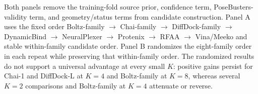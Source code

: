 \begin{table}[!ht]
\vspace{2pt}
\raggedright\footnotesize
Both panels remove the training-fold source prior, confidence term, PoseBusters-validity term, and geometry/status terms from candidate construction. Panel A uses the fixed order Boltz-family $\rightarrow$ Chai-family $\rightarrow$ DiffDock-family $\rightarrow$ DynamicBind $\rightarrow$ NeuralPlexer $\rightarrow$ Protenix $\rightarrow$ RFAA $\rightarrow$ Vina/Meeko and stable within-family candidate order. Panel B randomizes the eight-family order in each repeat while preserving that within-family order. The randomized results do not support a universal advantage at every small $K$: positive gains persist for Chai-1 and DiffDock-L at $K=4$ and Boltz-family at $K=8$, whereas several $K=2$ comparisons and Boltz-family at $K=4$ attenuate or reverse.
\end{table}
